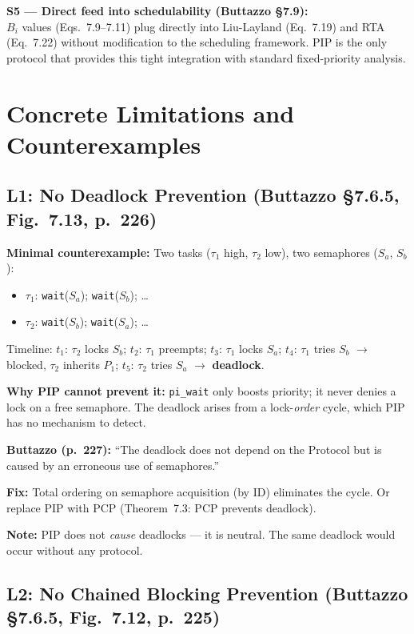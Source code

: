 \documentclass[conference,onecolumn]{IEEEtran}
\begin{document}
\textbf{S5 --- Direct feed into schedulability (Buttazzo \S7.9):}\\
$B_i$ values (Eqs.~7.9--7.11) plug directly into Liu-Layland (Eq.~7.19)
and RTA (Eq.~7.22) without modification to the scheduling framework.
PIP is the only protocol that provides this tight integration with
standard fixed-priority analysis.

\section{Concrete Limitations and Counterexamples}

\subsection{L1: No Deadlock Prevention (Buttazzo \S7.6.5, Fig.~7.13, p.~226)}

\textbf{Minimal counterexample:}
Two tasks ($\tau_1$ high, $\tau_2$ low), two semaphores ($S_a$, $S_b$):
\begin{itemize}
  \item $\tau_1$: \texttt{wait}($S_a$); \texttt{wait}($S_b$); \ldots
  \item $\tau_2$: \texttt{wait}($S_b$); \texttt{wait}($S_a$); \ldots
\end{itemize}
Timeline: $t_1$: $\tau_2$ locks $S_b$; $t_2$: $\tau_1$ preempts; $t_3$:
$\tau_1$ locks $S_a$; $t_4$: $\tau_1$ tries $S_b$ $\to$ blocked, $\tau_2$
inherits $P_1$; $t_5$: $\tau_2$ tries $S_a$ $\to$ \textbf{deadlock}.

\textbf{Why PIP cannot prevent it:}
\texttt{pi\_wait} only boosts priority; it never denies a lock on a
free semaphore. The deadlock arises from a lock-\emph{order} cycle,
which PIP has no mechanism to detect.

\textbf{Buttazzo (p.~227):} ``The deadlock does not depend on the Protocol
but is caused by an erroneous use of semaphores.''

\textbf{Fix:} Total ordering on semaphore acquisition (by ID) eliminates
the cycle. Or replace PIP with PCP (Theorem~7.3: PCP prevents deadlock).

\textbf{Note:} PIP does not \emph{cause} deadlocks --- it is neutral.
The same deadlock would occur without any protocol.

\subsection{L2: No Chained Blocking Prevention (Buttazzo \S7.6.5, Fig.~7.12, p.~225)}
\end{document}
